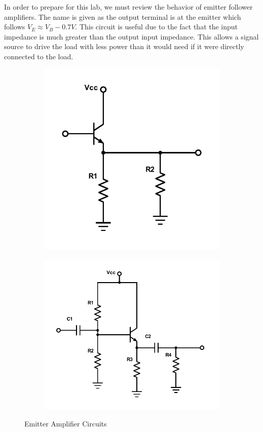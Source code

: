 \documentclass[11pt,letterpaper,onecolumn]{article}
\begin{document}
 In order to prepare for this lab, we must review the behavior of emitter follower amplifiers. The name is given as the output terminal is at the emitter which follows $V_E \approx V_B - 0.7V$. This circuit is useful due to the fact that the input impedance is much greater than the output input impedance. This allows a signal source to drive the load with less power than it would need if it were directly connected to the load. 

\begin{figure}[H]
\begin{subfigure}{.5\textwidth}
  \centering
  \includegraphics[scale =.6]{Lab-7A.pdf}
  \caption{}
  \label{fig:sub1}
\end{subfigure}%
\begin{subfigure}{.5\textwidth}
  \centering
  \includegraphics[scale=.5]{Lab-7C.pdf}
  \caption{}
  \label{fig:sub2}
\end{subfigure}
\caption{Emitter Amplifier Circuits}
\label{fig:test}
\end{figure}
\end{document}
